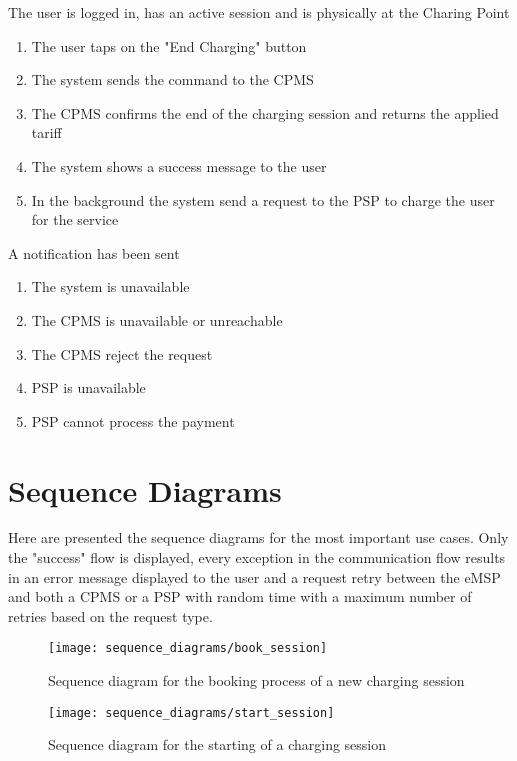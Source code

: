 \begin{enumerate}
	{The user is logged in, has an active session and is physically at the Charing Point}
	{
	\begin{enumerate}[1.]
	\item The user taps on the "End Charging" button
	\item The system sends the command to the CPMS
	\item The CPMS confirms the end of the charging session and returns the applied tariff
	\item The system shows a success message to the user
	\item In the background the system send a request to the PSP to charge the user for the service
	\end{enumerate}
	}
	{A notification has been sent}
	{
	\begin{enumerate}[1.]
	\item The system is unavailable
	\item The CPMS is unavailable or unreachable
	\item The CPMS reject the request
	\item PSP is unavailable
	\item PSP cannot process the payment
	\end{enumerate}
	}
	
	
\end{enumerate}
\clearpage
\newpage

\section{Sequence Diagrams}
Here are presented the sequence diagrams for the most important use cases. Only the "success" flow is displayed, every exception in the communication flow results in an error message displayed to the user and a request retry between the eMSP and both a CPMS or a PSP with random time with a maximum number of retries based on the request type.\\

\begin{figure}[h]
\centering
\texttt{[image: sequence\_diagrams/book\_session]}
\caption{Sequence diagram for the booking process of a new charging session}
\end{figure}


\begin{figure}[h]
\centering
\texttt{[image: sequence\_diagrams/start\_session]}
\caption{Sequence diagram for the starting of a charging session}
\end{figure}


